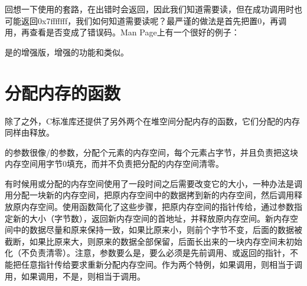 回想一下使用的套路，在出错时会返回，因此我们知道需要读，但在成功调用时也可能返回0x7fffffff，我们如何知道需要读呢？最严谨的做法是首先把置0，再调用，再查看是否变成了错误码。Man Page上有一个很好的例子：





是的增强版，增强的功能和类似。




\section{分配内存的函数}
%
除了之外，C标准库还提供了另外两个在堆空间分配内存的函数，它们分配的内存同样由释放。




的参数很像/的参数，分配个元素的内存空间，每个元素占字节，并且负责把这块内存空间用字节0填充，而并不负责把分配的内存空间清零。



有时候用或分配的内存空间使用了一段时间之后需要改变它的大小，一种办法是调用分配一块新的内存空间，把原内存空间中的数据拷到新的内存空间，然后调用释放原内存空间。使用函数简化了这些步骤，把原内存空间的指针传给，通过参数指定新的大小（字节数），返回新内存空间的首地址，并释放原内存空间。新内存空间中的数据尽量和原来保持一致，如果比原来小，则前个字节不变，后面的数据被截断，如果比原来大，则原来的数据全部保留，后面长出来的一块内存空间未初始化（不负责清零）。注意，参数要么是，要么必须是先前调用、或返回的指针，不能把任意指针传给要求重新分配内存空间。作为两个特例，如果调用，则相当于调用，如果调用，不是，则相当于调用。


